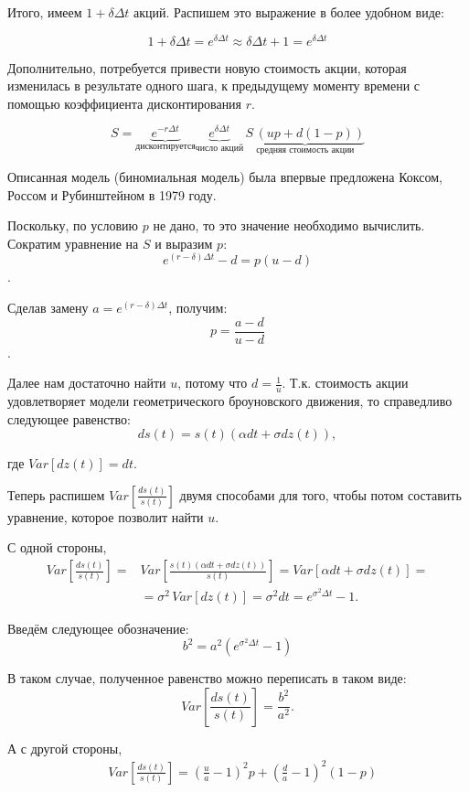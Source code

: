 \documentclass[oneside,final,12pt]{article}
\begin{document}
Итого, имеем $1 + \delta \Delta t$ акций. Распишем это выражение в более удобном виде:

$$ 1 + \delta \Delta t = {e^{\delta \Delta t} \approx \delta \Delta t + 1} = e^{\delta \Delta t} $$

Дополнительно, потребуется привести новую стоимость акции, которая изменилась в результате одного шага, к предыдущему моменту времени с помощью коэффициента дисконтирования $r$.

$$ S =  \underbrace{e^{-r\Delta t}}_{\text{дисконтируется}}  \underbrace{e^{\delta \Delta t} }_{\text{число акций}}\,\underbrace{S \, (up+d(1-p))}_{\text{средняя стоимость акции}} $$

Описанная модель (биномиальная модель) была впервые предложена Коксом, Россом и Рубинштейном \cite{cox} в 1979 году.

Поскольку, по условию $p$ не дано, то это значение необходимо вычислить. Сократим уравнение на $S$ и выразим $p$:
$$ e^{(r-\delta)\Delta t}-d = p(u-d) $$.

Сделав замену $a=e^{(r-\delta)\Delta t}$, получим:
$$ p = \frac{a-d}{u-d} $$.

Далее нам достаточно найти $u$, потому что $d=\frac{1}{u}$. Т.к. стоимость акции удовлетворяет модели геометрического броуновского движения, то справедливо следующее равенство:
$$ ds(t) = s(t)(\alpha dt+\sigma dz(t)), $$

\noindent
где $Var[dz(t)] = dt$.

Теперь распишем $ Var \left[ \frac{ds(t)}{s(t)}\right]$ двумя способами для того, чтобы потом составить уравнение, которое позволит найти $u$.

С одной стороны,
\begin{align*}
    Var \left[\frac{ds(t)}{s(t)}\right] = & Var\left[\frac{s(t)(\alpha dt+\sigma dz(t))}{s(t)}\right] = Var\left[\alpha dt+\sigma dz(t)\right] = \\
    & = \sigma^2 \, Var\left[dz(t)\right] = \sigma^2 dt = e^{\sigma^2 \Delta t}-1.
\end{align*}

Введём следующее обозначение:
$$ b^2 = a^2(e^{\sigma^2\Delta t}-1) $$

В таком случае, полученное равенство можно переписать в таком виде:
$$
Var \left[\frac{ds(t)}{s(t)}\right] = \frac{b^2}{a^2}.
$$

А с другой стороны,
\begin{align*}
    & Var\left[\frac{ds(t)}{s(t)}\right] = \left( \frac{u}{a}-1\right)^2p+\left(\frac{d}{a}-1\right)^2(1-p)
\end{align*}
\end{document}
